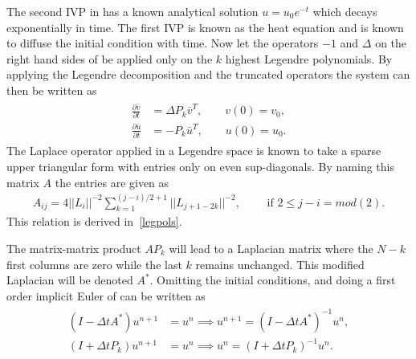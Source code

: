 The second IVP in  has a known analytical solution 
$u = u_0e^{-t}$ which decays exponentially in time. The first IVP is known 
as the heat equation and is known to diffuse the initial condition with time. 
Now let the operators $-1$ and $\Delta$ on the right hand sides of 
be applied only on the $k$ highest Legendre polynomials. By applying the Legendre decomposition
and the truncated operators the system can then be written as 
%
\begin{align}
    \begin{split}
    \frac{\partial \bar v }{\partial t}
    &= \Delta P_{k}\bar v^T , \qquad v(0) = v_0, \\
        \frac{\partial \bar u }{\partial t} 
        &=   -P_{k}\bar u^T , \qquad u(0) = u_0.
    \label{eq:ivps2}
    \end{split}
\end{align}
%
The Laplace operator applied in a Legendre space is known to take a sparse upper triangular form
with entries only on even sup-diagonals. By naming this matrix $A$ the entries are given as 
%
\begin{align}
    A_{ij} = 4||L_i||^{-2} \sum_{k=1}^{(j-i)/2+1} ||L_{j+1-2k}||^{-2}, \qquad \text{ if } 2 \le j-i = mod(2). 
    \label{Laplace-entries}
\end{align}
%
This relation is derived in~\ref{legpols}.

The matrix-matrix product $AP_{k}$ will lead to a Laplacian matrix where the $N-k$ first columns are zero
while the last $k$ remains unchanged. This modified Laplacian will be denoted $A^*$.
Omitting the initial conditions, and doing a first order implicit 
Euler of  can be written as 
%
\begin{align}
    \begin{split}
    (I-\Delta t A^*)u^{n+1} &= u^n  \implies u^{n+1}= (I-\Delta t A^*)^{-1}u^{n}, \\
    (I+\Delta t P_{k})u^{n+1} &= u^n \implies u^n = (I+\Delta t P_{k})^{-1}u^{n}.
    \label{eq:timestep}
    \end{split}
\end{align}
%

